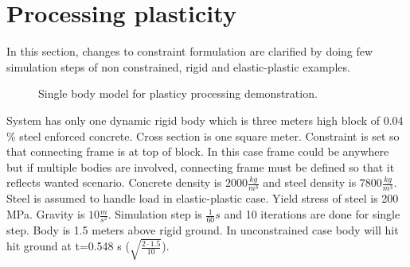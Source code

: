 \section{Processing plasticity}

In this section, changes to constraint formulation are clarified by doing few simulation steps of non constrained, rigid and
elastic-plastic examples.

\begin{figure}[htb!]
\centering
{}
\caption{Single body model for plasticy processing demonstration.}
\label{fig:tensionModel}
\end{figure}

System has only one dynamic rigid body which is three meters high block of 0.04 \% steel enforced concrete. 
Cross section is one square meter.
Constraint is set so that connecting frame is at top of block. 
In this case frame could be anywhere but if multiple bodies are involved, connecting frame must be defined
so that it reflects wanted scenario.
Concrete density is $2000 \frac{kg}{m^3}$ and steel density is $7800 \frac{kg}{m^3}$. 
Steel is assumed to handle load in elastic-plastic case. Yield stress of steel is 200 MPa.
Gravity is $10 \frac{m}{s^2}$. Simulation step is $\frac{1}{60} s$ and 10 
iterations are done for single step.
Body is 1.5 meters above rigid ground. In unconstrained case body will hit hit ground at t=0.548 s 
($\sqrt{\frac{2 \cdot 1.5}{10}}$).


